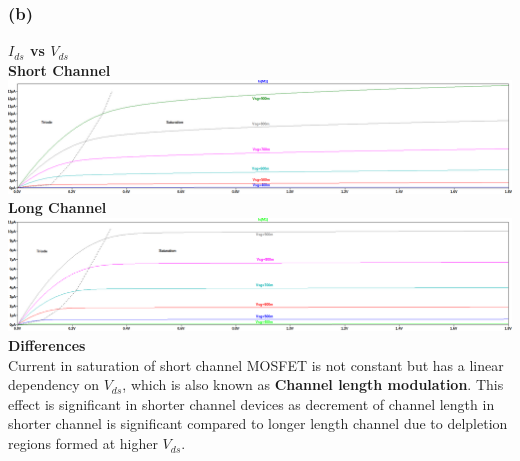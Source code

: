 \documentclass{article}
\begin{document}
\subsubsection*{(b)}
\textbf{$I_{ds}$ vs $V_{ds}$}\\
 \newline
\textbf{Short Channel}\\
\includegraphics[scale=0.28]{./figs/Q4_pmos_sc_vds_st.png}\\
 \newline
\textbf{Long Channel}\\
\includegraphics[scale=0.28]{./figs/Q4_pmos_lc_vds_st.png}\\
 \newline
\textbf{Differences}\\
Current in saturation of short channel MOSFET is not constant but has a linear dependency on $V_{ds}$, which is also known as \textbf{Channel length modulation}. This effect is significant in shorter channel devices as decrement of channel length in shorter channel is significant compared to longer length channel due to delpletion regions formed at higher $V_{ds}$. 
\end{document}
